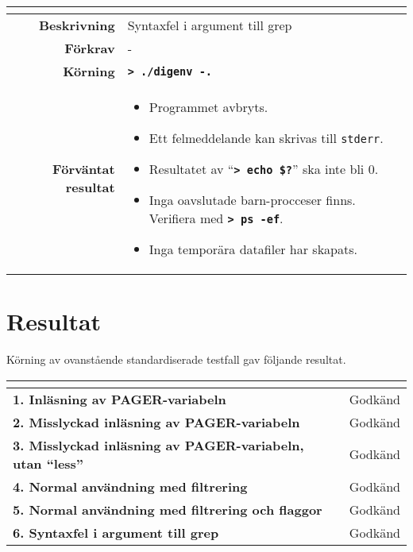 \documentclass[a4paper,10pt,titlepage]{article}
\newcommand{\cmdline}[1]{\mbox{\textbf{\texttt{> #1}}}}
\begin{document}
\begin{table}[H]
	\begin{tabularx}{\textwidth}{>{\bfseries}r  X }
		\multicolumn{2}{c}{\large\textbf{Testfall 6}} \\[0.1cm]
		\toprule	Beskrivning				& Syntaxfel i argument till grep \\
		\midrule	Förkrav					& - \\
		\midrule	Körning					& \cmdline{./digenv -.} \\
		\midrule	Förväntat resultat		& \begin{itemize}
  			\setlength{\itemsep}{0pt}
  			\setlength{\parskip}{0pt}
  			\setlength{\parsep}{0pt}
			\item Programmet avbryts.
			\item Ett felmeddelande kan skrivas till \texttt{stderr}.
			\item Resultatet av ``\cmdline{echo \$?}'' ska inte bli $0$.
			\item Inga oavslutade barn-procceser finns. Verifiera med \cmdline{ps -ef}.
			\item Inga temporära datafiler har skapats.
		\end{itemize} \\
		\bottomrule
	\end{tabularx}
\end{table}

\newpage
\section{Resultat}

Körning av ovanstående standardiserade testfall gav följande resultat.

\begin{tabularx}{\textwidth}{>{\bfseries}l  X }
	\multicolumn{2}{c}{\large\textbf{Testfallsresultat}} \\[0.1cm]
	\toprule
	1. Inläsning av PAGER-variabeln 							& Godkänd \\
	2. Misslyckad inläsning av PAGER-variabeln					& Godkänd \\
	3. Misslyckad inläsning av PAGER-variabeln, utan ``less''	& Godkänd \\
	4. Normal användning med filtrering 						& Godkänd \\
	5. Normal användning med filtrering och flaggor				& Godkänd \\
	6. Syntaxfel i argument till grep							& Godkänd \\
	\bottomrule
\end{tabularx}
\end{document}
